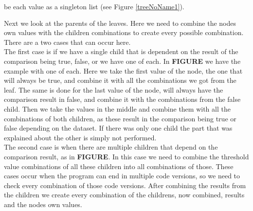 be each value as a singleton list (see Figure \ref{treeNoName1}).

Next we look at the parents of the leaves. Here we need to combine the nodes
own values with the children combinations to create every possible
combination. There are a two cases that can occur here. \\
The first case is if we have a single child that is dependent on the result of
the comparison being true, false, or we have one of each. In
\textbf{FIGURE} we have the example with one of each. Here we take the first
value of the node, the one that will always be true, and combine it with all
the combinations we got from the leaf. The same is done for the last value of
the node, will always have the comparison result in false, and combine it with
the combinations from the false child. Then we take the values in the middle
and combine them with all the combinations of both children, as these result in
the comparison being true or false depending on the dataset. If there was only
one child the part that was explained about the other is simply not performed.\\
The second case is when 
there are multiple children that depend on the comparison result, as in
\textbf{FIGURE}. In this case we need to combine the threshold value
combinations of all these children into all combinations of those. These cases
occur when the program can end in multiple code versions, so we need to check
every combination of those code versions. After combining the results from the
children we create every combination of the childrens, now combined, results
and the nodes own values. 



